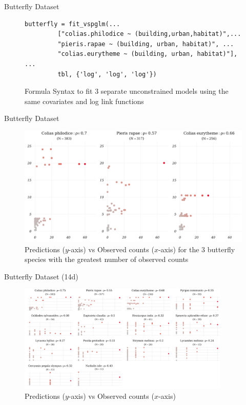\documentclass[9pt,notes=hide]{beamer}
\begin{document}
\begin{frame}[fragile]{Butterfly Dataset}
	\begin{figure}
		\centering
		\begin{verbatim}
butterfly = fit_vspglm(...
         ["colias.philodice ~ (building,urban,habitat)",...
         "pieris.rapae ~ (building, urban, habitat)", ...
         "colias.eurytheme ~ (building, urban, habitat)"], ...
         tbl, {'log', 'log', 'log'})
\end{verbatim}
		\caption{Formula Syntax to fit $3$ separate unconstrained models using the same covariates and log link functions}
	\end{figure}
\end{frame}


\begin{frame}{Butterfly Dataset}
	\begin{figure}
		\centering
		\includegraphics[width = \textwidth]{figures/butterfly_3d_poisson.png}
		\caption{Predictions ($y$-axis) vs Observed counts ($x$-axis) for the $3$ butterfly species with the greatest number of observed counts}
		\label{fig:butterfly_3d}
	\end{figure}
\end{frame}

\begin{frame}{Butterfly Dataset (14d)}
	\begin{figure}
		\centering
		\includegraphics[width = 0.9\textwidth]{figures/butterfly_14d_poisson.png}
		\caption{Predictions ($y$-axis) vs Observed counts ($x$-axis) }
		\label{fig:butterfly_14d}
	\end{figure}
\end{frame}
\end{document}
